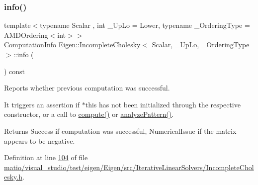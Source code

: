 \subsubsection{\texorpdfstring{info()}{info()}\hspace{0.1cm}{\footnotesize\ttfamily [2/2]}}
{\footnotesize\ttfamily template$<$typename Scalar , int \+\_\+\+Up\+Lo = Lower, typename \+\_\+\+Ordering\+Type  = A\+M\+D\+Ordering$<$int$>$$>$ \\
\hyperlink{group__enums_ga85fad7b87587764e5cf6b513a9e0ee5e}{Computation\+Info} \hyperlink{class_eigen_1_1_incomplete_cholesky}{Eigen\+::\+Incomplete\+Cholesky}$<$ Scalar, \+\_\+\+Up\+Lo, \+\_\+\+Ordering\+Type $>$\+::info (\begin{DoxyParamCaption}{ }\end{DoxyParamCaption}) const\hspace{0.3cm}{\ttfamily [inline]}}



Reports whether previous computation was successful. 

It triggers an assertion if {\ttfamily $\ast$this} has not been initialized through the respective constructor, or a call to \hyperlink{class_eigen_1_1_incomplete_cholesky_a7966bedeebbeaa7a8fe4dd1da3797a0b}{compute()} or \hyperlink{class_eigen_1_1_incomplete_cholesky_a702560ecdddef77dc51d20ab22bd974e}{analyze\+Pattern()}.

\begin{DoxyReturn}{Returns}
{\ttfamily Success} if computation was successful, {\ttfamily Numerical\+Issue} if the matrix appears to be negative. 
\end{DoxyReturn}


Definition at line \hyperlink{matio_2visual__studio_2test_2eigen_2_eigen_2src_2_iterative_linear_solvers_2_incomplete_cholesky_8h_source_l00104}{104} of file \hyperlink{matio_2visual__studio_2test_2eigen_2_eigen_2src_2_iterative_linear_solvers_2_incomplete_cholesky_8h_source}{matio/visual\+\_\+studio/test/eigen/\+Eigen/src/\+Iterative\+Linear\+Solvers/\+Incomplete\+Cholesky.\+h}.

\mbox{\label{class_eigen_1_1_incomplete_cholesky_a7d1f1878505fd1862e6f2286d27ff09a}} 
